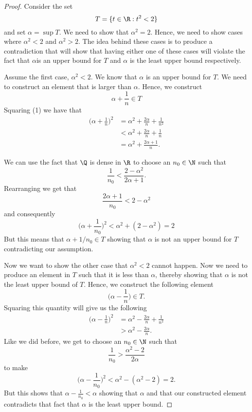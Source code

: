 \begin{proof}
    Consider the set 
    \[ T = \{ t \in \R : t^2 < 2 \} \]
    and set \( \alpha = \sup T \). We need to show that \( \alpha^2 = 2\). Hence, we need to show cases where \(  \alpha^2 < 2 \) and \( \alpha^2 > 2 \). The idea behind these cases is to produce a contradiction that will show that having either one of these cases will violate the fact that \( \alpha \)is an upper bound for \( T \) and \( \alpha\) is the least upper bound respectively. 

    Assume the first case, \( \alpha^2 < 2 \). We know that \( \alpha\) is an upper bound for \( T \). We need to construct an element that is larger than \( \alpha \). Hence, we construct 
    \[ \alpha + \frac{1}{n} \in T \tag{1}\]
    Squaring (1) we have that 
    \begin{align*}
        \bigg(\alpha + \frac{1}{n}\bigg)^2 &= \alpha^2 + \frac{2\alpha}{n} + \frac{1}{n^2} \\ 
                &< \alpha^2 + \frac{2\alpha}{n} + \frac{1}{n} \\
                &= \alpha^2 + \frac{2\alpha + 1}{n}.
    \end{align*}

    We can use the fact that \( \Q \) is dense in \( \R \) to choose an \( n_0 \in \N \) such that 
    \[ \frac{1}{n_0} < \frac{ 2 - \alpha^2}{2 \alpha + 1 }.\]
    Rearranging we get that 
    \[ \frac{2 \alpha + 1}{n_0} <  2 - \alpha^2 \] 
    and consequently 
    \[\bigg(\alpha + \frac{1}{n_0}\bigg)^2 < \alpha^2 + (2 - \alpha^2) = 2 \]
    But this means that \( \alpha + 1/n_0 \in T \) showing that \( \alpha \) is not an upper bound for \( T \) contradicting our assumption. 

    Now we want to show the other case that \( \alpha^2 < 2 \) cannot happen. Now we need to produce an element in \( T \) such that it is less than \( \alpha \), thereby showing that \( \alpha \) is not the least upper bound of \( T \). Hence, we construct the following element 
    \[ \bigg(\alpha - \frac{1}{n}\bigg)\in T. \]
    Squaring this quantity will give us the following
    \begin{align*}
        \bigg(\alpha - \frac{1}{n}\bigg)^2 &= \alpha^2 -\frac{2\alpha}{n} + \frac{1}{n^2} \\
        &> \alpha^2 - \frac{2 \alpha}{n}.
    \end{align*}
    Like we did before, we get to choose an \( n_0 \in \N \) such that 
    \[ \frac{1}{n_0} > \frac{\alpha^2 - 2}{2 \alpha} \]
    to make 
    \[\bigg(\alpha - \frac{1}{n_0}\bigg)^2 < \alpha^2 - (\alpha^2 - 2) = 2.\]
    But this shows that \( \alpha - \frac{1}{n_0} < \alpha \) showing that \( \alpha \) and that our constructed element contradicts that fact that \( \alpha\) is the least upper bound. 

\end{proof}



